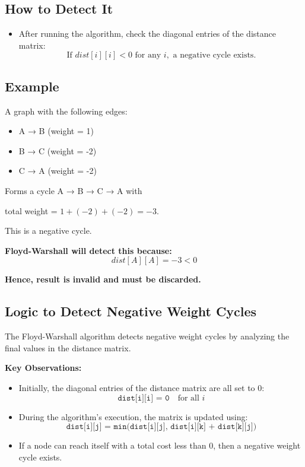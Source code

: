 \documentclass[14pt,a4paper]{extarticle}
\begin{document}
\subsection*{How to Detect It}
\begin{itemize}[leftmargin=2em]
    \item After running the algorithm, check the diagonal entries of the distance matrix:
    \[
        \text{If } dist[i][i] < 0 \text{ for any } i, \text{ a negative cycle exists.}
    \]
\end{itemize}

\subsection*{Example}
A graph with the following edges:
\begin{itemize}
    \item A → B (weight = 1)
    \item B → C (weight = -2)
    \item C → A (weight = -2)
\end{itemize}

\vspace{1cm}
Forms a cycle A → B → C → A with 
\begin{center}
    total weight = \(1 + (-2) + (-2) = -3\). 
\end{center}
\hspace{0.8cm}This is a negative cycle.


\textbf{Floyd-Warshall will detect this because:}
\[
    dist[A][A] = -3 < 0
\]

\textbf{Hence, result is invalid and must be discarded.}

\subsection{Logic to Detect Negative Weight Cycles}

The Floyd-Warshall algorithm detects negative weight cycles by analyzing the final values in the distance matrix.

\textbf{Key Observations:}
\begin{itemize}[leftmargin=2em]
    \item Initially, the diagonal entries of the distance matrix are all set to 0: \\
    \[
    \texttt{dist[i][i] = 0} \quad \text{for all } i
    \]
    
    \item During the algorithm's execution, the matrix is updated using:
    \[
    \texttt{dist[i][j] = min(dist[i][j], dist[i][k] + dist[k][j])}
    \]

    \item If a node can reach itself with a total cost less than 0, then a negative weight cycle exists.
\end{itemize}
\end{document}
